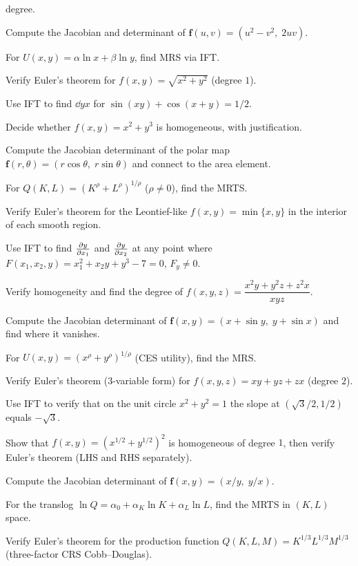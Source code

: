 \begin{problems}
        degree.
  \item Compute the Jacobian and determinant of
        $\mathbf{f}(u,v)=(u^{2}-v^{2},\;2uv)$.
  \item For $U(x,y)=\alpha\ln x+\beta\ln y$, find MRS via IFT.
  \item Verify Euler's theorem for $f(x,y)=\sqrt{x^{2}+y^{2}}$
        (degree $1$).
  \item Use IFT to find $\dd{y}{x}$ for $\sin(xy)+\cos(x+y)=1/2$.
  \item Decide whether $f(x,y)=x^{2}+y^{3}$ is homogeneous, with
        justification.
  \item Compute the Jacobian determinant of the polar map
        $\mathbf{f}(r,\theta)=(r\cos\theta,\;r\sin\theta)$ and connect to
        the area element.
  \item For $Q(K,L)=(K^{\rho}+L^{\rho})^{1/\rho}$ ($\rho\neq 0$), find the
        MRTS.
  \item Verify Euler's theorem for the Leontief-like
        $f(x,y)=\min\{x,y\}$ in the interior of each smooth region.
  \item Use IFT to find $\frac{\partial y}{\partial x_{1}}$ and $\frac{\partial y}{\partial x_{2}}$ at any point
        where $F(x_{1},x_{2},y)=x_{1}^{2}+x_{2}y+y^{3}-7=0$, $F_{y}\neq 0$.
  \item Verify homogeneity and find the degree of
        $f(x,y,z)=\dfrac{x^{2}y+y^{2}z+z^{2}x}{xyz}$.
  \item Compute the Jacobian determinant of
        $\mathbf{f}(x,y)=(x+\sin y,\;y+\sin x)$ and find where it
        vanishes.
  \item For $U(x,y)=(x^{\rho}+y^{\rho})^{1/\rho}$ (CES utility), find the
        MRS.
  \item Verify Euler's theorem (3-variable form) for
        $f(x,y,z)=xy+yz+zx$ (degree $2$).
  \item Use IFT to verify that on the unit circle $x^{2}+y^{2}=1$ the
        slope at $(\sqrt{3}/2,1/2)$ equals $-\sqrt{3}$.
  \item Show that $f(x,y)=(x^{1/2}+y^{1/2})^{2}$ is homogeneous of
        degree $1$, then verify Euler's theorem (LHS and RHS separately).
  \item Compute the Jacobian determinant of
        $\mathbf{f}(x,y)=(x/y,\;y/x)$.
  \item For the translog $\ln Q = \alpha_{0}+\alpha_{K}\ln K+\alpha_{L}\ln L$,
        find the MRTS in $(K,L)$ space.
  \item Verify Euler's theorem for the production function
        $Q(K,L,M)=K^{1/3}L^{1/3}M^{1/3}$ (three-factor CRS Cobb--Douglas).

\end{problems}
